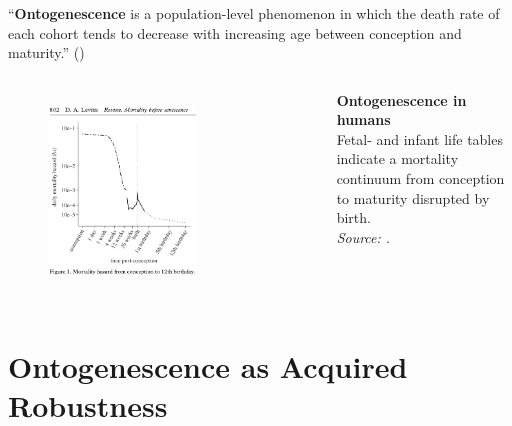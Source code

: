 \documentclass{beamer}
\begin{document}
\begin{frame}
\frametitle{\insertsection}

\enquote{\textbf{Ontogenescence} is a population-level phenomenon in which the death rate of each cohort tends to decrease with increasing age between conception and maturity.} (\cite{Levitis2011})

\begin{columns}[c]

\begin{figure}[htb!]
\includegraphics[width = 0.65\textwidth]{./fig/levitis-2011-figure_1.png}\\
\end{figure}

\footnotesize\textbf{Ontogenescence in humans}\\
Fetal- and infant life tables indicate a mortality continuum from conception to maturity disrupted by birth.\\
\scriptsize\emph{Source: \textcite{Levitis2011}.}

\end{columns}

\end{frame}

\section{Ontogenescence as Acquired Robustness} %
\end{document}
